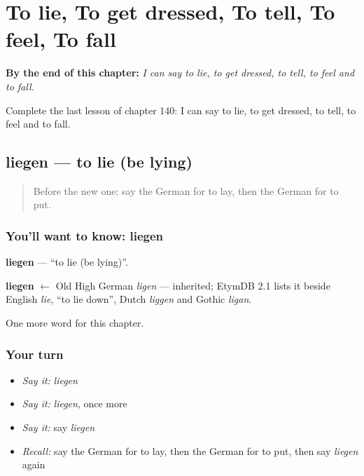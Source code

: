 
\chapter{To lie, To get dressed, To tell, To feel, To fall}
\label{ch:ge-to-lie-to-get-dressed-to-tell-to-feel-to-fall}

\begin{chapteropening}
\textbf{By the end of this chapter:} \emph{I can say to lie, to get dressed, to tell, to feel and to fall.}

Complete the last lesson of chapter 140: I can say to lie, to get dressed, to tell, to feel and to fall.
\end{chapteropening}

\section[liegen]{liegen — to lie (be lying)}

\label{lesson:GE-C140-liegen}



\begin{quote}
Before the new one: say the German for to lay, then the German for to put.
\end{quote}

\subsection*{You'll want to know: liegen}
\textbf{liegen} — \textquotedblleft{}to lie (be lying)\textquotedblright{}.

\begin{cousinweb}
\textbf{liegen} $\leftarrow$ Old High German \emph{ligen} — inherited; EtymDB 2.1 lists it beside English \emph{lie}, \textquotedblleft{}to lie down\textquotedblright{}, Dutch \emph{liggen} and Gothic \emph{ligan}.
\end{cousinweb}

\begin{grammarlens}[title={What you've built}]
One more word for this chapter.
\end{grammarlens}

\subsection*{Your turn}
\begin{itemize}
\raggedright
  \item \emph{Say it:} \emph{liegen}
  \item \emph{Say it:} \emph{liegen}, once more
  \item \emph{Say it:} say \emph{liegen}
  \item \emph{Recall:} say the German for to lay, then the German for to put, then say \emph{liegen} again
\end{itemize}

